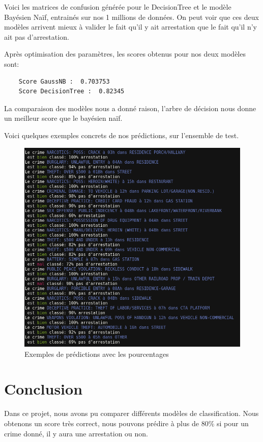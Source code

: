 \documentclass{article}
\begin{document}
    Voici les matrices de confusion générée pour le DecisionTree et le modèle 
    Bayésien Naïf, entrainés sur nos 1 millions de données. 
    On peut voir que ces deux modèles arrivent 
    mieux à valider le fait qu'il y ait arrestation que le fait qu'il n'y ait 
    pas d'arrestation.

    Après optimisation des paramètres, les scores obtenus pour nos deux modèles sont:
    \begin{Verbatim}
    Score GaussNB :  0.703753
    Score DecisionTree :  0.82345
    \end{Verbatim}

    La comparaison des modèles nous a donné raison, l'arbre de décision nous donne
    un meilleur score que le bayésien naïf.

    Voici quelques exemples concrets de nos prédictions, sur l'ensemble de test.
    \begin{figure}[H]
	    \centering
	    \includegraphics[scale=.4]{images/results.png}
	    \caption{Exemples de prédictions avec les pourcentages}
    \end{figure}


    \section{Conclusion}
    Dans ce projet, nous avons pu comparer différents modèles de classification.
    Nous obtenons un score très correct, nous pouvons prédire à plus de 80\% si pour 
    un crime donné, il y aura une arrestation ou non.
\end{document}
